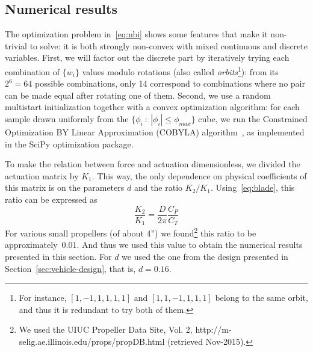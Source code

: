 
\subsection{Numerical results}
\label{sec:numerical-results}

The optimization problem in~\eqref{eq:nbi} shows some features that
make it non-trivial to solve: it is both strongly non-convex with
mixed continuous and discrete variables. First, we will factor out the
discrete part by iteratively trying each combination of $\{w_i\}$
values modulo rotations (also called \emph{orbits}\footnote{For
  instance, $[1,-1,1,1,1,1]$ and $[1,1,-1,1,1,1]$ belong to the same
  orbit, and thus it is redundant to try both of them.}): from its
$2^6=64$ possible combinations, only 14 correspond to combinations
where no pair can be made equal after rotating one of them. Second, we
use a random multistart initialization together with a convex
optimization algorithm: for each sample drawn uniformly from the
$\{\phi_i\::\:|\phi_i| \leq \phi_{max}\}$ cube, we run the Constrained
Optimization BY Linear Approximation (COBYLA) algorithm~\cite{powell94},
as implemented in the SciPy optimization package.


To make the relation between force and actuation dimensionless, we
divided the actuation matrix by $K_1$. This way, the only dependence
on physical coefficients of this matrix is on the parameters $d$ and
the ratio $K_2/K_1$. Using~\eqref{eq:blade}, this ratio can be
expressed as
\begin{equation}
  \frac{K_2}{K_1} = \frac{D}{2\pi} \frac{C_P}{C_T}
\end{equation}
For various small propellers (of about 4'') we found\footnote{We used the
  UIUC Propeller Data Site, Vol. 2,
  http://m-selig.ae.illinois.edu/props/propDB.html (retrieved
  Nov-2015).} this ratio to be approximately~0.01. And thus we used
this value to obtain the numerical results presented in this section.
For $d$ we used the one from the design presented in
Section~\ref{sec:vehicle-design}, that is, $d=0.16$.

